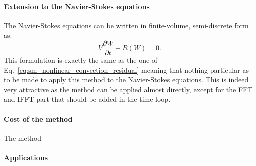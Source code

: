 \paragraph{Extension to the Navier-Stokes equations}
The Navier-Stokes equations can be written in finite-volume,
semi-discrete form as:
\begin{equation}
	V \frac{\partial W}{\partial t} + R(W) = 0.
	\label{eq:navier_stokes_fv_sd}
\end{equation}
This formulation is exactly the same as the one of 
Eq.~\ref{eq:sm_nonlinear_convection_residual} meaning that
nothing particular as to be made to apply this method to
the Navier-Stokes equations. This is indeed very attractive as the
method can be applied almost directly, except for the FFT and IFFT
part that should be added in the time loop.

\paragraph{Cost of the method}
The method 

\paragraph{Applications}
